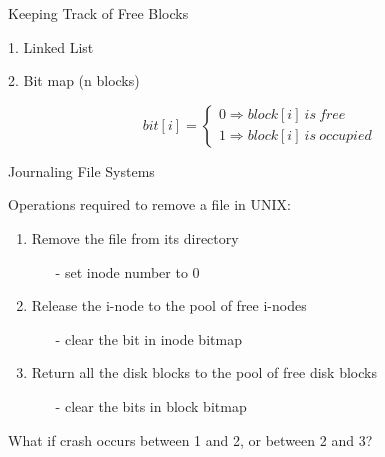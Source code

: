 \begin{frame}{Keeping Track of Free Blocks}
  \begin{varwidth}{.4\textwidth}
    \alert{1.} Linked List
    \begin{center}
       
    \end{center}
  \end{varwidth}\hfill
  \begin{varwidth}{.5\textwidth}
    \alert{2.} Bit map (n blocks)
    \begin{center}
       
    \end{center}
    \begin{equation*}
      bit[i]=
      \begin{cases}
        0\Rightarrow{}block[i]\ is\ free\\
        1\Rightarrow{}block[i]\ is\ occupied
      \end{cases}
    \end{equation*}
  \end{varwidth}
\end{frame}

\begin{frame}{Journaling File Systems}
  \begin{block}{Operations required to remove a file in UNIX:}
    \begin{enumerate}
    \item Remove the file from its directory
      \begin{itemize}
      \item[-] set inode number to 0
      \end{itemize}
    \item Release the i-node to the pool of free i-nodes
      \begin{itemize}
      \item[-] clear the bit in inode bitmap
      \end{itemize}
    \item Return all the disk blocks to the pool of free disk blocks
      \begin{itemize}
      \item[-] clear the bits in block bitmap
      \end{itemize}
    \end{enumerate}
    What if crash occurs between 1 and 2, or between 2 and 3?
  \end{block}
\end{frame}



